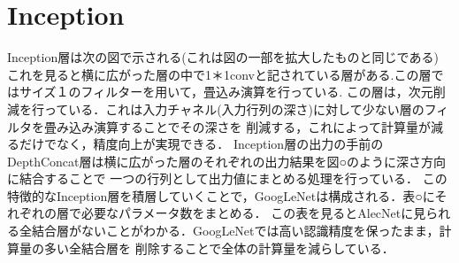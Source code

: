 {\section{Inception}
\label{sec:inception}
Inception層は次の図で示される(これは図の一部を拡大したものと同じである)
これを見ると横に広がった層の中で1＊1convと記されている層がある.この層ではサイズ１のフィルターを用いて，畳込み演算を行っている.
この層は，次元削減を行っている．これは入力チャネル(入力行列の深さ)に対して少ない層のフィルタを畳み込み演算することでその深さを
削減する，これによって計算量が減るだけでなく，精度向上が実現できる．
Inception層の出力の手前のDepthConcat層は横に広がった層のそれぞれの出力結果を図○のように深さ方向に結合することで
一つの行列として出力値にまとめる処理を行っている．
この特徴的なInception層を積層していくことで，GoogLeNetは構成される．表○にそれぞれの層で必要なパラメータ数をまとめる．
この表を見るとAlecNetに見られる全結合層がないことがわかる．GoogLeNetでは高い認識精度を保ったまま，計算量の多い全結合層を
削除することで全体の計算量を減らしている．
}